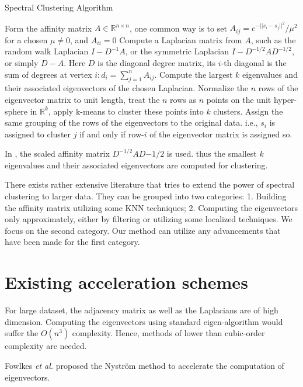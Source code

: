 \documentclass[10pt,a4paper, nocenter]{article}
\newcommand{\norm}[1]{\lvert\lvert {#1} \rvert\rvert}
\begin{document}
    
    \begin{algorithm}
    	\label{alg:spectralClust}
		\caption{Spectral Clustering Algorithm}
		\begin{algorithmic}[1]
		  	\State Form the affinity matrix $A\in \mathbb{R}^{n\times n}$, one common way is to set $A_{ij} = e^{-\norm{s_i - s_j}^2} / \mu^2$ for a chosen $\mu \ne 0$, and $A_{ii} = 0$
		  	\State Compute a Laplacian matrix from $A$, such as the random walk Laplacian $I-D^{-1}A$, or the symmetric Laplacian $I-D^{-1/2}AD^{-1/2}$, or simply $D-A$. Here $D$ is the diagonal degree matrix, its $i$-th diagonal is the sum of degrees at vertex $i: d_i = \sum_{j=1}^{n} A_{ij}$.
		  	\State Compute the largest $k$ eigenvalues and their associated eigenvectors of the chosen Laplacian.
		  	\State Normalize the $n$ rows of the eigenvector matrix to unit length, treat the $n$ rows as $n$ points on the unit hyper-sphere in $\mathbb{R}^k$, apply k-means to cluster these points into $k$ clusters. 
		  	\State Assign the same grouping of the rows of the eigenvectors to the original data. i.e., $s_i$ is assigned to cluster $j$ if and only if row-$i$ of the eigenvector matrix is assigned so.
		\end{algorithmic}
    \end{algorithm}

	In \cite{ng-jordan-01}, the scaled affinity matrix $D^{-1/2}AD{-1/2}$ is used. thus the smallest $k$ eigenvalues and their associated eigenvectors are computed for clustering. 
	
	There exists rather extensive literature that tries to extend the power of spectral clustering to larger data. They can be grouped into two categories: 1. Building the affinity matrix utilizing some KNN techniques; 2. Computing the eigenvectors only approximately, either by filtering or utilizing some localized techniques.
	\texttt{}
	We focus on the second category. Our method can utilize any advancements that have been made for the first category. 
	
	\section{Existing acceleration schemes}
	For large dataset, the adjacency matrix as well as the Laplacians are of high dimension. Computing the eigenvectors using standard eigen-algorithm would suffer the $O(n^3)$ complexity. Hence, methods of lower than cubic-order complexity are needed.
    
    Fowlkes \textit{et al.} \cite{Fowlkes-2004} proposed the Nystr\"om method to accelerate the computation of eigenvectors.
    
\end{document}
